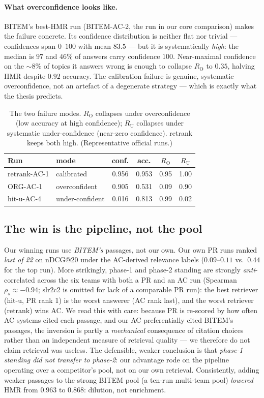 \documentclass[sigconf,nonacm]{acmart}
\newcommand{\HMR}{\textsc{HMR}}
\newcommand{\RO}{R_{\mathrm{O}}}
\newcommand{\RU}{R_{\mathrm{U}}}
\begin{document}
\paragraph{What overconfidence looks like.} BITEM's best-\HMR{} run (BITEM-AC-2, the run in
our core comparison) makes the failure concrete. Its confidence
distribution is neither flat nor trivial --- confidences span $0$--$100$ with mean $83.5$
--- but it is systematically \emph{high}: the median is $97$ and $46\%$ of answers carry
confidence $100$. Near-maximal confidence on the $\sim\!8\%$ of topics it answers wrong is
enough to collapse $\RO$ to $0.35$, halving \HMR{} despite $0.92$ accuracy. The calibration
failure is genuine, systematic overconfidence, not an artefact of a degenerate
strategy --- which is exactly what the thesis predicts.

\begin{table}[t]
\caption{The two failure modes. $\RO$ collapses under overconfidence (low accuracy at high
confidence); $\RU$ collapses under systematic under-confidence (near-zero confidence). retrank keeps both
high. (Representative official runs.)}
\label{tab:failure}
\small
\begin{tabular}{llcccc}
\toprule
Run & mode & conf. & acc. & $\RO$ & $\RU$ \\
\midrule
retrank-AC-1  & calibrated     & 0.956 & 0.953 & 0.95 & 1.00 \\
ORG-AC-1      & overconfident  & 0.905 & 0.531 & 0.09 & 0.90 \\
hit-u-AC-4    & under-confident & 0.016 & 0.813 & 0.99 & 0.02 \\
\bottomrule
\end{tabular}
\end{table}

\subsection{The win is the pipeline, not the pool}
\label{sec:pool}
Our winning runs use \emph{BITEM's} passages, not our own. Our own PR runs ranked
\emph{last of 22} on nDCG@20 under the AC-derived relevance labels ($0.09$--$0.11$ vs.\
$0.44$ for the top run). More strikingly, phase-1 and phase-2 standing are strongly
\emph{anti}-correlated across the six teams with both a PR and an AC run (Spearman
$\rho_s\approx-0.94$; slr2c2 is omitted for lack of a comparable PR run): the best retriever
(hit-u, PR rank 1) is the worst answerer (AC rank last), and the worst retriever (retrank)
wins AC. We read this with care: because PR is re-scored by how
often AC systems cited each passage, and our AC preferentially cited BITEM's passages, the
inversion is partly a \emph{mechanical} consequence of citation choices rather than an
independent measure of retrieval quality --- we therefore do not claim retrieval was
useless. The defensible, weaker conclusion is that \emph{phase-1 standing did not transfer
to phase-2}: our advantage rode on the pipeline operating over a competitor's pool, not on
our own retrieval. Consistently, adding weaker passages to the strong
BITEM pool (a ten-run multi-team pool) \emph{lowered} \HMR{} from $0.963$ to $0.868$:
dilution, not enrichment.
\end{document}
